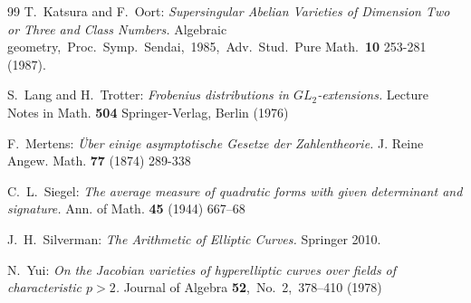 \documentclass[a4paper, 11pt]{article}
\theoremstyle{plain}
\newcommand{\?}{\textcolor{red}{??}}
\begin{document}
\begin{thebibliography}{99}
T.\ Katsura and F.\ Oort:
\textit{Supersingular Abelian Varieties of Dimension Two or Three and Class Numbers.}
Algebraic geometry,\ Proc.\ Symp.\  Sendai,\ 1985,\ Adv.\ Stud.\ Pure Math.\ {\bf 10} 253-281 (1987).


S.\ Lang and H.\ Trotter:
\textit{Frobenius distributions in ${GL}_2$-extensions.}
Lecture Notes in Math. {\bf 504} Springer-Verlag, Berlin (1976)



F.\ Mertens:
\textit{\"{U}ber einige asymptotische Gesetze der Zahlentheorie.} 
J. Reine Angew. Math. {\bf 77} (1874) 289-338

C.\ L.\ Siegel:
\textit{The average measure of quadratic forms with given determinant and signature.}
Ann. of Math. { \bf 45} (1944) 667--68

J.\ H.\ Silverman:
\textit{The Arithmetic of Elliptic Curves.}
 Springer  2010.


N.\ Yui:
\textit{On the Jacobian varieties of hyperelliptic curves over fields of characteristic $p > 2$.}
Journal of Algebra {\bf 52},\ No.\ 2,\ 378--410 (1978)


\end{thebibliography}
\end{document}
